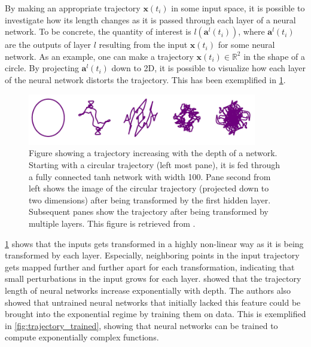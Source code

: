 By making an appropriate trajectory $\boldsymbol{x}(t_i)$ in some input space, it is possible to investigate how its length changes as it is passed through each layer of a neural network. To be concrete, the quantity of interest is $l(\boldsymbol{a}^{l}(t_i))$, where $\boldsymbol{a}^{l}(t_i)$ are the outputs of layer $l$ resulting from the input $\boldsymbol{x}(t_i)$ for some neural network. As an example, one can make a trajectory $\boldsymbol{x}(t_i) \in \mathbb{R}^2$ in the shape of a circle. By projecting $\boldsymbol{a}^{l}(t_i)$ down to 2D, it is possible to visualize how each layer of the neural network distorts the trajectory. This has been exemplified in \cref{fig:trajectoryLengthExample}.

\begin{figure}[H]
    \centering
    \includegraphics[width=10cm]{latex/figures/trajectoryLengthExample.PNG}
    \caption{Figure showing a trajectory increasing with the depth
of a network. Starting with a circular trajectory (left most
pane), it is fed through a fully connected tanh network with
width 100. Pane second from left shows the image of the circular
trajectory (projected down to two dimensions) after being transformed by the first hidden layer. Subsequent panes show the trajectory after being transformed by multiple layers. This figure is retrieved from \citet{raghu2017expressive}.}
\label{fig:trajectoryLengthExample}
\end{figure}

\cref{fig:trajectoryLengthExample} shows that the inputs gets transformed in a highly non-linear way as it is being transformed by each layer. Especially, neighboring points in the input trajectory gets mapped further and further apart for each transformation, indicating that small perturbations in the input grows for each layer. \citet{raghu2017expressive} showed that the trajectory length of neural networks increase exponentially with depth. The authors also showed that untrained neural networks that initially lacked this feature could be brought into the exponential regime by training them on data. This is exemplified in \cref{fig:trajectory_trained}, showing that neural networks can be trained to compute exponentially complex functions.

